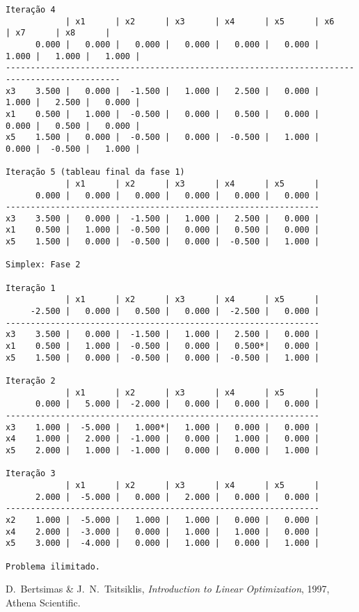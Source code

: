 \documentclass[12pt,a4paper]{article}
\begin{document}
\begin{tiny}
\begin{verbatim}
Iteração 4
            | x1      | x2      | x3      | x4      | x5      | x6      | x7      | x8      |
      0.000 |   0.000 |   0.000 |   0.000 |   0.000 |   0.000 |   1.000 |   1.000 |   1.000 |
---------------------------------------------------------------------------------------------
x3    3.500 |   0.000 |  -1.500 |   1.000 |   2.500 |   0.000 |   1.000 |   2.500 |   0.000 |
x1    0.500 |   1.000 |  -0.500 |   0.000 |   0.500 |   0.000 |   0.000 |   0.500 |   0.000 |
x5    1.500 |   0.000 |  -0.500 |   0.000 |  -0.500 |   1.000 |   0.000 |  -0.500 |   1.000 |

Iteração 5 (tableau final da fase 1)
            | x1      | x2      | x3      | x4      | x5      |
      0.000 |   0.000 |   0.000 |   0.000 |   0.000 |   0.000 |
---------------------------------------------------------------
x3    3.500 |   0.000 |  -1.500 |   1.000 |   2.500 |   0.000 |
x1    0.500 |   1.000 |  -0.500 |   0.000 |   0.500 |   0.000 |
x5    1.500 |   0.000 |  -0.500 |   0.000 |  -0.500 |   1.000 |

Simplex: Fase 2

Iteração 1
            | x1      | x2      | x3      | x4      | x5      |
     -2.500 |   0.000 |   0.500 |   0.000 |  -2.500 |   0.000 |
---------------------------------------------------------------
x3    3.500 |   0.000 |  -1.500 |   1.000 |   2.500 |   0.000 |
x1    0.500 |   1.000 |  -0.500 |   0.000 |   0.500*|   0.000 |
x5    1.500 |   0.000 |  -0.500 |   0.000 |  -0.500 |   1.000 |

Iteração 2
            | x1      | x2      | x3      | x4      | x5      |
      0.000 |   5.000 |  -2.000 |   0.000 |   0.000 |   0.000 |
---------------------------------------------------------------
x3    1.000 |  -5.000 |   1.000*|   1.000 |   0.000 |   0.000 |
x4    1.000 |   2.000 |  -1.000 |   0.000 |   1.000 |   0.000 |
x5    2.000 |   1.000 |  -1.000 |   0.000 |   0.000 |   1.000 |

Iteração 3
            | x1      | x2      | x3      | x4      | x5      |
      2.000 |  -5.000 |   0.000 |   2.000 |   0.000 |   0.000 |
---------------------------------------------------------------
x2    1.000 |  -5.000 |   1.000 |   1.000 |   0.000 |   0.000 |
x4    2.000 |  -3.000 |   0.000 |   1.000 |   1.000 |   0.000 |
x5    3.000 |  -4.000 |   0.000 |   1.000 |   0.000 |   1.000 |

Problema ilimitado.
\end{verbatim}
\end{tiny}


\begin{thebibliography}{99}
	 D.~Bertsimas \& J.~N.~Tsitsiklis, {\it Introduction to Linear Optimization}, 
	1997, Athena Scientific.
\end{thebibliography}

\end{document}
